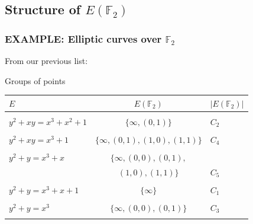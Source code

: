 \documentclass[10pt,handout]{beamer}%
\newcommand{\F}{\mathbb F}
\theoremstyle{definition}
\begin{document}
\subsection{Structure of \texorpdfstring{$E(\F_2)$}{E(F2)}}
\begin{frame}
\frametitle{EXAMPLE: Elliptic curves over $\F_2$}

From our previous list:
\begin{block}{Groups of points}
\begin{tabular}{|l|c|l|}
\hline
 $E$ & $E(\F_2)$ & $|E(\F_2)|$\\
\hline
&&\\
 $y^2+xy=x^3+x^2+1$ & $\{\infty,(0,1)\}$& $C_2$\\
&&\\
$y^2+xy=x^3+1$ & $\{\infty,(0,1),(1,0),(1,1)\}$ & $C_4$\\
&&\\
$y^2+y=x^3+x$&$\{\infty,(0,0),(0,1),$ &\\ &$(1,0),(1,1)\}$&$C_5$\\
&&\\
 $y^2+y=x^3+x+1$ &$\{\infty\}$&$C_1$\\
&&\\
$y^2+y=x^3$ & $\{\infty,(0,0), (0,1)\}$ & $C_3$ \\
&&\\\hline
\end{tabular}
\end{block}
\end{frame}
\end{document}
